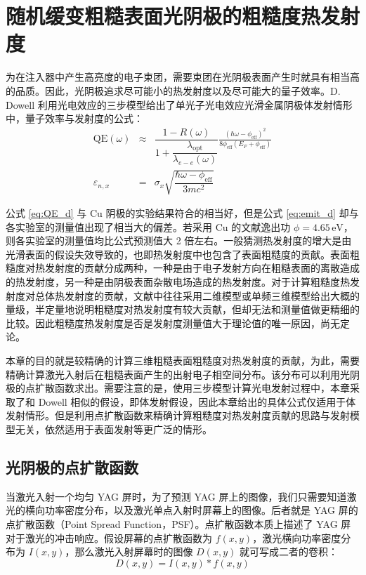 \chapter{随机缓变粗糙表面光阴极的粗糙度热发射度}
\label{chap:roughness}

为在注入器中产生高亮度的电子束团，需要束团在光阴极表面产生时就具有相当高的品质。因此，光阴极追求尽可能小的热发射度以及尽可能大的量子效率。D. Dowell 利用光电效应的三步模型给出了单光子光电效应光滑金属阴极体发射情形中，量子效率与发射度的公式：
\begin{eqnarray}
\text{QE}(\omega) &\approx& \dfrac{1-R(\omega)}{1+\dfrac{\lambda_{\text{opt}}}{\lambda_{e-e}(\omega)}}\frac{(\hbar\omega-\phi_{\text{eff}})^2}{8\phi_{\text{eff}}(E_F+\phi_{\text{eff}})}\label{eq:QE_d}\\
\varepsilon_{n,x} &=& \sigma_x\sqrt{\dfrac{\hbar\omega-\phi_{\text{eff}}}{3mc^2}}\label{eq:emit_d}
\end{eqnarray}

公式 \ref{eq:QE_d} 与 Cu 阴极的实验结果符合的相当好，但是公式 \ref{eq:emit_d} 却与各实验室的测量值出现了相当大的偏差。若采用 Cu 的文献逸出功 $\phi=4.65\,\text{eV}$，则各实验室的测量值均比公式预测值大 2 倍左右。一般猜测热发射度的增大是由光滑表面的假设失效导致的，也即热发射度中也包含了表面粗糙度的贡献。表面粗糙度对热发射度的贡献分成两种，一种是由于电子发射方向在粗糙表面的离散造成的热发射度，另一种是由阴极表面杂散电场造成的热发射度。对于计算粗糙度热发射度对总体热发射度的贡献，文献中往往采用二维模型或单频三维模型给出大概的量级，半定量地说明粗糙度对热发射度有较大贡献，但却无法和测量值做更精细的比较。因此粗糙度热发射度是否是发射度测量值大于理论值的唯一原因，尚无定论。

本章的目的就是较精确的计算三维粗糙表面粗糙度对热发射度的贡献，为此，需要精确计算激光入射后在粗糙表面产生的出射电子相空间分布。该分布可以利用光阴极的点扩散函数求出。需要注意的是，使用三步模型计算光电发射过程中，本章采取了和 Dowell 相似的假设，即体发射假设，因此本章给出的具体公式仅适用于体发射情形。但是利用点扩散函数来精确计算粗糙度对热发射度贡献的思路与发射模型无关，依然适用于表面发射等更广泛的情形。

\section{\label{s:psf}光阴极的点扩散函数}
当激光入射一个均匀 YAG 屏时，为了预测 YAG 屏上的图像，我们只需要知道激光的横向功率密度分布，以及激光单点入射时屏幕上的图像。后者就是 YAG 屏的点扩散函数（Point Spread Function，PSF）。点扩散函数本质上描述了 YAG 屏对于激光的冲击响应。假设屏幕的点扩散函数为 $f(x, y)$，激光横向功率密度分布为 $I(x, y)$，那么激光入射屏幕时的图像 $D(x, y)$ 就可写成二者的卷积：
\begin{equation}
D(x, y) = I(x, y) * f(x, y)
\label{eq:PSF}
\end{equation}

